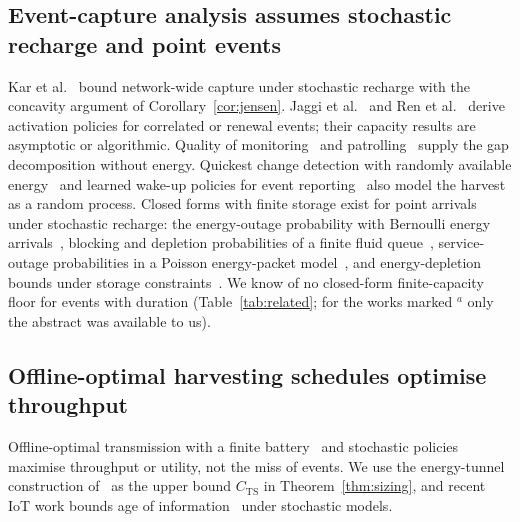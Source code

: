 \subsection{Event-capture analysis assumes stochastic recharge and point events}
Kar et al.~\cite{kar2006ton} bound network-wide capture under stochastic recharge with the concavity argument of Corollary~\ref{cor:jensen}. Jaggi et al.~\cite{jaggi2009wn,jaggi2008tosn} and Ren et al.~\cite{ren2014tpds,ren2015p2p} derive activation policies for correlated or renewal events; their capacity results are asymptotic or algorithmic. Quality of monitoring~\cite{yau2010tosn,he2012tpds} and patrolling~\cite{lin2013opre} supply the gap decomposition without energy. Quickest change detection with randomly available energy~\cite{naha2024tsp} and learned wake-up policies for event reporting~\cite{ruizguirola2026iotj} also model the harvest as a random process. Closed forms with finite storage exist for point arrivals under stochastic recharge: the energy-outage probability with Bernoulli energy arrivals~\cite{ballestrin2026cl}, blocking and depletion probabilities of a finite fluid queue~\cite{deepak2026mcap}, service-outage probabilities in a Poisson energy-packet model~\cite{kuaban2024fenrg}, and energy-depletion bounds under storage constraints~\cite{yan2024iotj}. We know of no closed-form finite-capacity floor for events with duration (Table~\ref{tab:related}; for the works marked $^{a}$ only the abstract was available to us).

\subsection{Offline-optimal harvesting schedules optimise throughput}
Offline-optimal transmission with a finite battery~\cite{tutuncuoglu2012twc,yang2012tcom,ozel2011jsac} and stochastic policies~\cite{sharma2010twc,srivastava2013ton} maximise throughput or utility, not the miss of events. We use the energy-tunnel construction of~\cite{tutuncuoglu2012twc} as the upper bound $C_{\mathrm{TS}}$ in Theorem~\ref{thm:sizing}, and recent IoT work bounds age of information~\cite{lei2025iotj,botirov2026iotj} under stochastic models.


